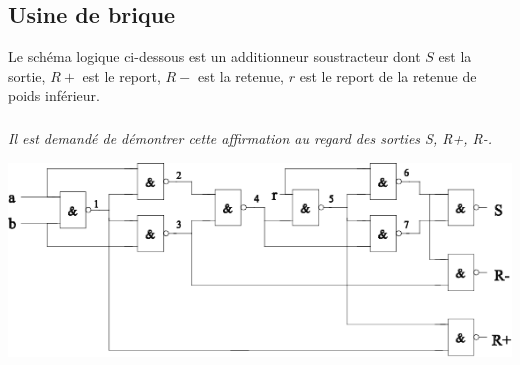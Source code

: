 \documentclass[10pt]{article}
\begin{document}
\subsection*{Usine de brique}
\setcounter{subparagraph}{0}
Le schéma logique ci-dessous est un additionneur soustracteur dont $S$ est la sortie, $R+$ est le report, $R-$ est la retenue, $r$ est le report de la retenue de poids inférieur. 
	
\subparagraph{}
\textit{Il est demandé de démontrer cette affirmation au regard des sorties S, R+, R-.}
\begin{center}
\includegraphics[width=.8\textwidth]{images/additionneur}
\end{center}
\end{document}

